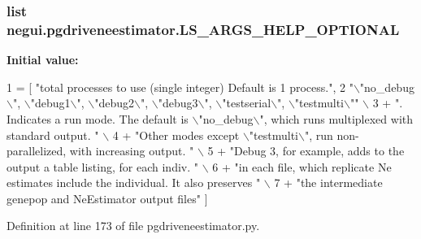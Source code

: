 \subsubsection[{\texorpdfstring{L\+S\+\_\+\+A\+R\+G\+S\+\_\+\+H\+E\+L\+P\+\_\+\+O\+P\+T\+I\+O\+N\+AL}{LS_ARGS_HELP_OPTIONAL}}]{\setlength{\rightskip}{0pt plus 5cm}list negui.\+pgdriveneestimator.\+L\+S\+\_\+\+A\+R\+G\+S\+\_\+\+H\+E\+L\+P\+\_\+\+O\+P\+T\+I\+O\+N\+AL}\hypertarget{namespacenegui_1_1pgdriveneestimator_aee59027c12769e0749f07a70867259b4}{}\label{namespacenegui_1_1pgdriveneestimator_aee59027c12769e0749f07a70867259b4}
{\bfseries Initial value\+:}
\begin{DoxyCode}
1 = [  \textcolor{stringliteral}{"total processes to use (single integer) Default is 1 process."},
2                 \textcolor{stringliteral}{"\(\backslash\)"no\_debug\(\backslash\)", \(\backslash\)"debug1\(\backslash\)", \(\backslash\)"debug2\(\backslash\)", \(\backslash\)"debug3\(\backslash\)", \(\backslash\)"testserial\(\backslash\)", \(\backslash\)"testmulti\(\backslash\)""} \(\backslash\)
3                 + \textcolor{stringliteral}{".  Indicates a run mode. The default is \(\backslash\)"no\_debug\(\backslash\)", which runs multiplexed with
       standard output.  "} \(\backslash\)
4                 + \textcolor{stringliteral}{"Other modes except \(\backslash\)"testmulti\(\backslash\)", run non-parallelized, with increasing output.  "} \(\backslash\)
5                 + \textcolor{stringliteral}{"Debug 3, for example, adds to the output a table listing, for each indiv. "} \(\backslash\)
6                 + \textcolor{stringliteral}{"in each file, which replicate Ne estimates include the individual.  It also preserves "} 
      \(\backslash\)
7                 + \textcolor{stringliteral}{"the intermediate genepop and NeEstimator output files"} ]
\end{DoxyCode}


Definition at line 173 of file pgdriveneestimator.\+py.

